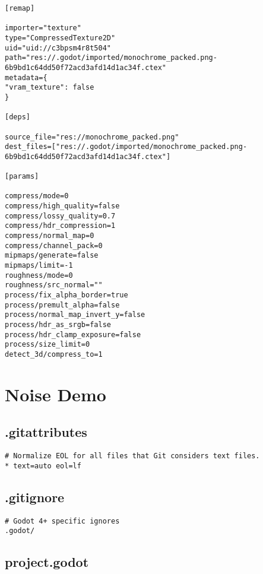 \begin{lstlisting}
[remap]

importer="texture"
type="CompressedTexture2D"
uid="uid://c3bpsm4r8t504"
path="res://.godot/imported/monochrome_packed.png-6b9bd1c64dd50f72acd3afd14d1ac34f.ctex"
metadata={
"vram_texture": false
}

[deps]

source_file="res://monochrome_packed.png"
dest_files=["res://.godot/imported/monochrome_packed.png-6b9bd1c64dd50f72acd3afd14d1ac34f.ctex"]

[params]

compress/mode=0
compress/high_quality=false
compress/lossy_quality=0.7
compress/hdr_compression=1
compress/normal_map=0
compress/channel_pack=0
mipmaps/generate=false
mipmaps/limit=-1
roughness/mode=0
roughness/src_normal=""
process/fix_alpha_border=true
process/premult_alpha=false
process/normal_map_invert_y=false
process/hdr_as_srgb=false
process/hdr_clamp_exposure=false
process/size_limit=0
detect_3d/compress_to=1
\end{lstlisting}

\section{Noise Demo}

\subsection{.gitattributes}

\begin{lstlisting}
# Normalize EOL for all files that Git considers text files.
* text=auto eol=lf
\end{lstlisting}

\subsection{.gitignore}

\begin{lstlisting}
# Godot 4+ specific ignores
.godot/
\end{lstlisting}

\subsection{project.godot}

